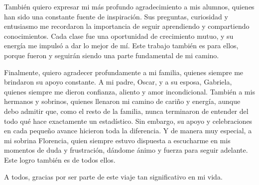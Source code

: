 También quiero expresar mi más profundo agradecimiento a mis alumnos, quienes han sido una constante fuente de inspiración. Sus preguntas, curiosidad y entusiasmo me recordaron la importancia de seguir aprendiendo y compartiendo conocimientos. Cada clase fue una oportunidad de crecimiento mutuo, y su energía me impulsó a dar lo mejor de mí. Este trabajo también es para ellos, porque fueron y seguirán siendo una parte fundamental de mi camino.

Finalmente, quiero agradecer profundamente a mi familia, quienes siempre me brindaron su apoyo constante. A mi padre, Oscar, y a su esposa, Gabriela, quienes siempre me dieron confianza, aliento y amor incondicional. También a mis hermanos y sobrinos, quienes llenaron mi camino de cariño y energía, aunque debo admitir que, como el resto de la familia, nunca terminaron de entender del todo qué hace exactamente un estadístico. Sin embargo, su apoyo y celebraciones en cada pequeño avance hicieron toda la diferencia. Y de manera muy especial, a mi sobrina Florencia, quien siempre estuvo dispuesta a escucharme en mis momentos de duda y frustración, dándome ánimo y fuerza para seguir adelante. Este logro también es de todos ellos.

A todos, gracias por ser parte de este viaje tan significativo en mi vida.
